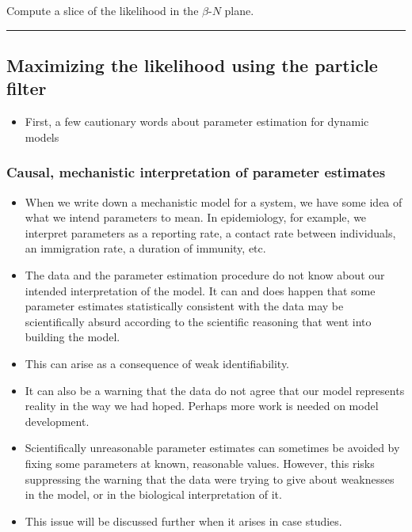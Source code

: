 \documentclass[]{article}
\providecommand{\tightlist}{%
  \setlength{\itemsep}{0pt}\setlength{\parskip}{0pt}}
\begin{document}
Compute a slice of the likelihood in the \(\beta\)-\(N\) plane.

\begin{center}\rule{0.5\linewidth}{\linethickness}\end{center}

\subsection{Maximizing the likelihood using the particle
filter}\label{maximizing-the-likelihood-using-the-particle-filter}

\begin{itemize}
\tightlist
\item
  First, a few cautionary words about parameter estimation for dynamic
  models
\end{itemize}

\subsubsection{Causal, mechanistic interpretation of parameter
estimates}\label{causal-mechanistic-interpretation-of-parameter-estimates}

\begin{itemize}
\item
  When we write down a mechanistic model for a system, we have some idea
  of what we intend parameters to mean. In epidemiology, for example, we
  interpret parameters as a reporting rate, a contact rate between
  individuals, an immigration rate, a duration of immunity, etc.
\item
  The data and the parameter estimation procedure do not know about our
  intended interpretation of the model. It can and does happen that some
  parameter estimates statistically consistent with the data may be
  scientifically absurd according to the scientific reasoning that went
  into building the model.
\item
  This can arise as a consequence of weak identifiability.
\item
  It can also be a warning that the data do not agree that our model
  represents reality in the way we had hoped. Perhaps more work is
  needed on model development.
\item
  Scientifically unreasonable parameter estimates can sometimes be
  avoided by fixing some parameters at known, reasonable values.
  However, this risks suppressing the warning that the data were trying
  to give about weaknesses in the model, or in the biological
  interpretation of it.
\item
  This issue will be discussed further when it arises in case studies.
\end{itemize}
\end{document}
